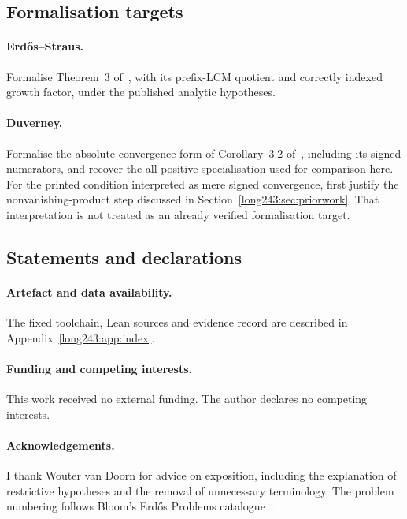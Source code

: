 \documentclass[11pt]{article}
\begin{document}
\subsection*{Formalisation targets}

\paragraph{Erd\H{o}s--Straus.}
Formalise Theorem~3 of~\cite{erdosstraus1964}, with its prefix-LCM quotient
and correctly indexed growth factor, under the published analytic hypotheses.

\paragraph{Duverney.}
Formalise the absolute-convergence form of Corollary~3.2
of~\cite{duverney2001}, including its signed numerators, and recover the
all-positive specialisation used for comparison here. For the printed
condition interpreted as mere signed convergence, first justify the
nonvanishing-product step discussed in
Section~\ref{long243:sec:priorwork}. That interpretation is not treated
as an already verified formalisation target.

\subsection*{Statements and declarations}

\paragraph{Artefact and data availability.} The fixed toolchain,
Lean sources and evidence record are described in
Appendix~\ref{long243:app:index}.

\paragraph{Funding and competing interests.} This work received no external
funding.  The author declares no competing interests.

\paragraph{Acknowledgements.} I thank Wouter van Doorn for advice on
exposition, including the explanation of restrictive hypotheses and the
removal of unnecessary terminology. The problem numbering follows
Bloom's Erd\H{o}s Problems catalogue~\cite{erdosproblems}.
\end{document}
